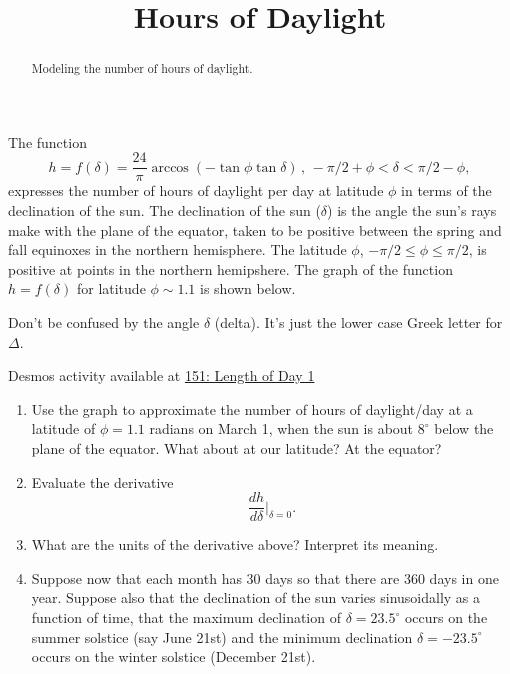 \documentclass{ximera}
\title{Hours of Daylight}
\begin{document}
\begin{abstract}
Modeling the number of hours of daylight.
\end{abstract}
\maketitle


\begin{question}  \label{Qdf4ppp3455}
The function
\[
    h = f(\delta) = \frac{24}{\pi} \arccos(-\tan\phi \tan\delta) \, , \, -\pi/2+\phi < \delta < \pi/2-\phi ,
\]
expresses the number of hours of daylight per day at latitude $\phi$ in terms of the declination of the sun. The declination of the sun ($\delta$) is the angle the sun's rays make with the plane of the equator, taken to be positive between the spring and fall equinoxes in the northern hemisphere. The latitude $\phi$, $-\pi/2 \leq \phi \leq \pi/2$, is positive at points in the northern hemipshere. The graph of the function $h=f(\delta)$ for latitude $\phi\sim 1.1$ is shown below.

Don't be confused by the angle $\delta$ (delta). It's just the lower case Greek letter for $\Delta$.

\begin{onlineOnly}
    \begin{center}
\end{center}
\end{onlineOnly}

Desmos activity available at \href{https://www.desmos.com/calculator/ifomatkcta}{151: Length of Day 1}

\begin{enumerate}
\item Use the graph to approximate the number of hours of daylight/day at a latitude of $\phi=1.1$ radians on March 1, when the sun is about $8^\circ$ below the plane of the equator. What about at our latitude? At the equator?

\item Evaluate the derivative %
\[
  \frac{dh}{d\delta} \Big|_{\delta = 0} .
\]

\item What are the units of the derivative above? Interpret its meaning.

\item Suppose now that each month has 30 days so that there are 360 days in one year. Suppose also that the declination of the sun varies sinusoidally as a function of time, that the maximum declination of $\delta = 23.5^\circ$ occurs on the summer solstice (say June 21st) and the minimum declination $\delta = -23.5^\circ$ occurs on the winter solstice (December 21st). 


\end{enumerate}
\end{question}
\end{document}
